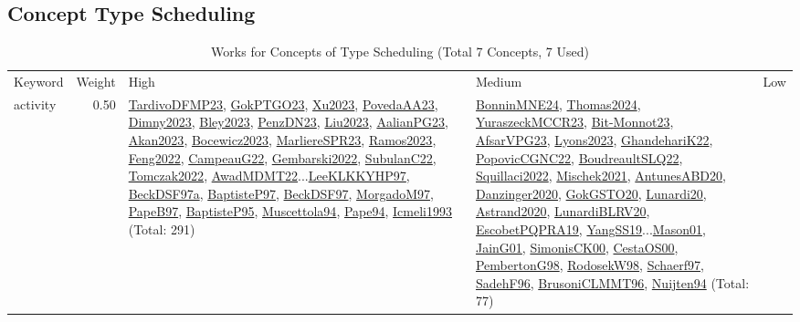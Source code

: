 \clearpage
\subsection{Concept Type Scheduling}
\label{sec:Scheduling}
\label{Scheduling}
{\scriptsize
\begin{longtable}{p{3cm}r>{\raggedright\arraybackslash}p{6cm}>{\raggedright\arraybackslash}p{6cm}>{\raggedright\arraybackslash}p{8cm}}
\rowcolor{white}\caption{Works for Concepts of Type Scheduling (Total 7 Concepts, 7 Used)}\\ \toprule
\rowcolor{white}Keyword & Weight & High & Medium & Low\\ \midrule\endhead
\bottomrule
\endfoot
\index{activity}\index{Scheduling!activity}activity &  0.50 & \hyperref[detail:TardivoDFMP23]{TardivoDFMP23}, \hyperref[detail:GokPTGO23]{GokPTGO23}, \hyperref[detail:Xu2023]{Xu2023}, \hyperref[detail:PovedaAA23]{PovedaAA23}, \hyperref[detail:Dimny2023]{Dimny2023}, \hyperref[detail:Bley2023]{Bley2023}, \hyperref[detail:PenzDN23]{PenzDN23}, \hyperref[detail:Liu2023]{Liu2023}, \hyperref[detail:AalianPG23]{AalianPG23}, \hyperref[detail:Akan2023]{Akan2023}, \hyperref[detail:Bocewicz2023]{Bocewicz2023}, \hyperref[detail:MarliereSPR23]{MarliereSPR23}, \hyperref[detail:Ramos2023]{Ramos2023}, \hyperref[detail:Feng2022]{Feng2022}, \hyperref[detail:CampeauG22]{CampeauG22}, \hyperref[detail:Gembarski2022]{Gembarski2022}, \hyperref[detail:SubulanC22]{SubulanC22}, \hyperref[detail:Tomczak2022]{Tomczak2022}, \hyperref[detail:AwadMDMT22]{AwadMDMT22}...\hyperref[detail:LeeKLKKYHP97]{LeeKLKKYHP97}, \hyperref[detail:BeckDSF97a]{BeckDSF97a}, \hyperref[detail:BaptisteP97]{BaptisteP97}, \hyperref[detail:BeckDSF97]{BeckDSF97}, \hyperref[detail:MorgadoM97]{MorgadoM97}, \hyperref[detail:PapeB97]{PapeB97}, \hyperref[detail:BaptisteP95]{BaptisteP95}, \hyperref[detail:Muscettola94]{Muscettola94}, \hyperref[detail:Pape94]{Pape94}, \hyperref[detail:Icmeli1993]{Icmeli1993} (Total: 291) & \hyperref[detail:BonninMNE24]{BonninMNE24}, \hyperref[detail:Thomas2024]{Thomas2024}, \hyperref[detail:YuraszeckMCCR23]{YuraszeckMCCR23}, \hyperref[detail:Bit-Monnot23]{Bit-Monnot23}, \hyperref[detail:AfsarVPG23]{AfsarVPG23}, \hyperref[detail:Lyons2023]{Lyons2023}, \hyperref[detail:GhandehariK22]{GhandehariK22}, \hyperref[detail:PopovicCGNC22]{PopovicCGNC22}, \hyperref[detail:BoudreaultSLQ22]{BoudreaultSLQ22}, \hyperref[detail:Squillaci2022]{Squillaci2022}, \hyperref[detail:Mischek2021]{Mischek2021}, \hyperref[detail:AntunesABD20]{AntunesABD20}, \hyperref[detail:Danzinger2020]{Danzinger2020}, \hyperref[detail:GokGSTO20]{GokGSTO20}, \hyperref[detail:Lunardi20]{Lunardi20}, \hyperref[detail:Astrand2020]{Astrand2020}, \hyperref[detail:LunardiBLRV20]{LunardiBLRV20}, \hyperref[detail:EscobetPQPRA19]{EscobetPQPRA19}, \hyperref[detail:YangSS19]{YangSS19}...\hyperref[detail:Mason01]{Mason01}, \hyperref[detail:JainG01]{JainG01}, \hyperref[detail:SimonisCK00]{SimonisCK00}, \hyperref[detail:CestaOS00]{CestaOS00}, \hyperref[detail:PembertonG98]{PembertonG98}, \hyperref[detail:RodosekW98]{RodosekW98}, \hyperref[detail:Schaerf97]{Schaerf97}, \hyperref[detail:SadehF96]{SadehF96}, \hyperref[detail:BrusoniCLMMT96]{BrusoniCLMMT96}, \hyperref[detail:Nuijten94]{Nuijten94} (Total: 77) 
\end{longtable}}
